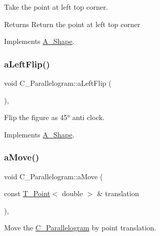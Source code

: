 Take the point at left top corner. 

\begin{DoxyReturn}{Returns}
Return the point at left top corner 
\end{DoxyReturn}


Implements \hyperlink{classA__Shape_abe6781b13037bf7ecea8ff9456b31533}{A\+\_\+\+Shape}.

\mbox{\label{classC__Parallelogram_a284a59c9f1c778ac8da80efedc313354}} 
\subsubsection{\texorpdfstring{a\+Left\+Flip()}{aLeftFlip()}}
{\footnotesize\ttfamily void C\+\_\+\+Parallelogram\+::a\+Left\+Flip (\begin{DoxyParamCaption}{ }\end{DoxyParamCaption})\hspace{0.3cm}{\ttfamily [override]}, {\ttfamily [virtual]}}



Flip the figure as 45° anti clock. 



Implements \hyperlink{classA__Shape_abe947e7003cb63be2b4f6c439533427d}{A\+\_\+\+Shape}.

\mbox{\label{classC__Parallelogram_ac77ea776b24c551114d84eaf147f6977}} 
\subsubsection{\texorpdfstring{a\+Move()}{aMove()}}
{\footnotesize\ttfamily void C\+\_\+\+Parallelogram\+::a\+Move (\begin{DoxyParamCaption}\item[{const \hyperlink{classT__Point}{T\+\_\+\+Point}$<$ double $>$ \&}]{translation }\end{DoxyParamCaption})\hspace{0.3cm}{\ttfamily [override]}, {\ttfamily [virtual]}}



Move the \hyperlink{classC__Parallelogram}{C\+\_\+\+Parallelogram} by point translation. 


